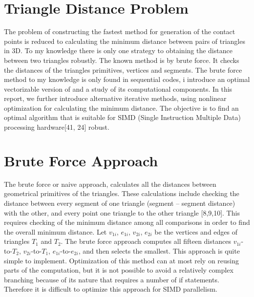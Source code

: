 \documentclass[times,12pt]{ACME2015article}
\begin{document}
\clearpage

\section{Triangle Distance Problem}
The problem of constructing the fastest method for generation of the contact points is reduced to calculating the minimum distance between pairs of triangles in 3D. To my knowledge there is only one strategy to obtaining the distance between two triangles robustly. The known method is by brute force. It checks the distances of the triangles primitives, vertices and segments. The brute force method to my knowledge is only found in sequential codes, i introduce an optimal vectorizable version of and a study of its computational components. In this report, we further introduce alternative iterative methods, using nonlinear optimization for calculating the minimum distance. The objective is to find an optimal algorithm that is suitable for SIMD (Single Instruction Multiple Data) processing hardware[41, 24] robust. 

\section{Brute Force Approach}
The brute force or naive approach, calculates all the distances between geometrical primitives of the triangles. These calculations include checking the distance between every segment of one triangle (segment – segment distance) with the other, and every  point one triangle to the other triangle [8,9,10]. This requires checking of the minimum distance among all comparisons in order to find the overall minimum distance. Let $v_{1i}$, $e_{1i}$, $v_{2i}$, $e_{2i}$ be the vertices and edges of triangles $T_1$ and $T_2$. The brute force approach computes all fifteen distances $v_{1i}$-to-$T_2$, $v_{2i}$-to-$T_1$, $e_{1i}$-to-$e_{2i}$, and then selects the smallest. This approach is quite simple to implement. Optimization of this method can at most rely on reusing parts of the computation, but it is not possible to avoid a relatively complex branching because of its nature that requires a number of if statements. Therefore it is difficult to optimize this approach for SIMD parallelism.
\end{document}
